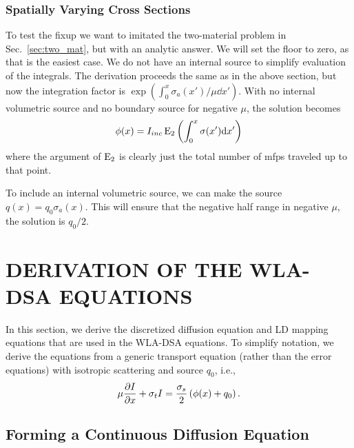 \subsection{Spatially Varying Cross Sections}

To test the fixup we want to imitated the two-material problem in Sec.~\ref{sec:two_mat},
but with an analytic answer.  We will set the floor to zero, as that is the easiest case.
We do not have an internal source to simplify evaluation of the integrals.  The derivation
proceeds the same as in the above section, but now the integration factor is
$\exp(\int_{0}^x \sigma_a(x')/\mu\dd x')$.  With no internal volumetric source and no
boundary source for negative $\mu$, the solution becomes
\begin{equation}
    \phi(x) = I_{inc} \operatorname{E}_{2}\left(\int_{0}^x\sigma(x')\mathrm{d} x'\right)
\end{equation}
where the argument of $\operatorname{E}_{2}$ is clearly just the total number of mfps traveled
up to that point.

To include an internal volumetric source, we can make the source $q(x) = q_0 \sigma_a(x)$.
This will ensure that the negative half range in negative $\mu$, the solution is $q_0/2$.

\chapter{\uppercase{Derivation of the WLA-DSA Equations}}
\label{sec:wla_derivation}

In this section, we derive the discretized diffusion equation and LD mapping equations
that are used in the WLA-DSA equations.  To simplify notation, we
derive the equations from a generic transport equation (rather than the error equations) with isotropic scattering
and source $q_0$, i.e.,
\begin{equation}\label{eq:ss_trans}
    \mu \frac{\partial I}{\partial x} + \sigma_t I = \frac{\sigma_s}{2}\left( \phi(x) + q_0\right).
\end{equation}

\section{Forming a Continuous Diffusion Equation}

